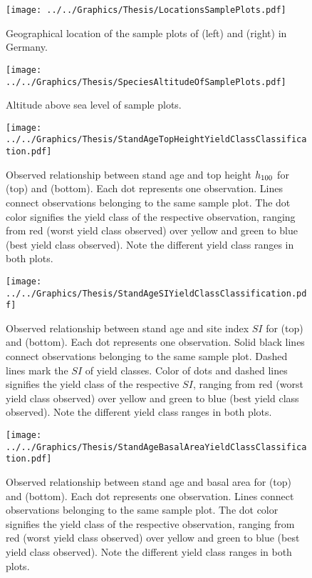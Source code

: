 \begin{figure}[H]
  \centering
  \texttt{[image: ../../Graphics/Thesis/LocationsSamplePlots.pdf]}
  \caption{Geographical location of the sample plots of \Beech{} (left) and \Spruce{} (right) in Germany.}
  \label{fig:LocationsSamplePlots}
\end{figure}

\begin{figure}[H]
  \centering
  \texttt{[image: ../../Graphics/Thesis/SpeciesAltitudeOfSamplePlots.pdf]}
  \caption{Altitude above sea level of sample plots.}
  \label{fig:SpeciesAltitudeOfSamplePlots}
\end{figure}

\newpage{}
\begin{figure}[H]
  \centering
  \texttt{[image: ../../Graphics/Thesis/StandAgeTopHeightYieldClassClassification.pdf]}
  \caption{Observed relationship between stand age and top height \(h_{100}\) for \Beech{} (top) and \Spruce{} (bottom).  Each dot represents one observation.  Lines connect observations belonging to the same sample plot.  The dot color signifies the yield class of the respective observation, ranging from red (worst yield class observed) over yellow and green to blue (best yield class observed).  Note the different yield class ranges in both plots.}
  \label{fig:StandAgeTopHeightYieldClassClassification}
\end{figure}

\newpage{}
\begin{figure}[H]
  \centering
  \texttt{[image: ../../Graphics/Thesis/StandAgeSIYieldClassClassification.pdf]}
  \caption{Observed relationship between stand age and site index \(SI\) for \Beech{} (top) and \Spruce{} (bottom).  Each dot represents one observation.  Solid black lines connect observations belonging to the same sample plot.  Dashed lines mark the \(SI\) of yield classes.  Color of dots and dashed lines signifies the yield class of the respective \(SI\), ranging from red (worst yield class observed) over yellow and green to blue (best yield class observed).  Note the different yield class ranges in both plots.}
  \label{fig:StandAgeSIYieldClassClassification}
\end{figure}

\newpage{}
\begin{figure}[H]
  \centering
  \texttt{[image: ../../Graphics/Thesis/StandAgeBasalAreaYieldClassClassification.pdf]}
  \caption{Observed relationship between stand age and basal area for \Beech{} (top) and \Spruce{} (bottom).  Each dot represents one observation.  Lines connect observations belonging to the same sample plot.  The dot color signifies the yield class of the respective observation, ranging from red (worst yield class observed) over yellow and green to blue (best yield class observed).  Note the different yield class ranges in both plots.}
  \label{fig:StandAgeBasalAreaYieldClassClassification}
\end{figure}

